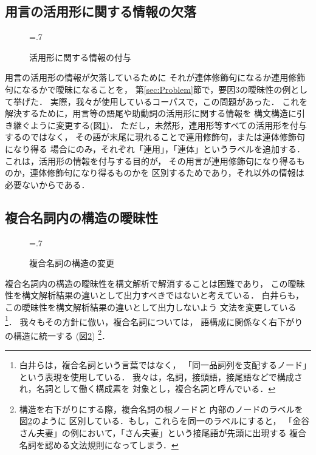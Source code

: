 \subsection{用言の活用形に関する情報の欠落}

\begin{figure}[tp]
  \centering
  \epsfxsize=.7\textwidth
  \caption{活用形に関する情報の付与}
  \label{fig:conjugation}
\end{figure}

用言の活用形の情報が欠落しているために
それが連体修飾句になるか連用修飾句になるかで曖昧になることを，
第\ref{sec:Problem}節で，要因3の曖昧性の例として挙げた．
実際，我々が使用しているコーパスで，この問題があった．
これを解決するために，用言等の語尾や助動詞の活用形に関する情報を
構文構造に引き継ぐように変更する(図\ref{fig:conjugation})．
ただし，未然形，連用形等すべての活用形を付与するのではなく，
その語が末尾に現れることで連用修飾句，または連体修飾句になり得る
場合にのみ，それぞれ「連用」，「連体」というラベルを追加する．
これは，活用形の情報を付与する目的が，
その用言が連用修飾句になり得るものか，連体修飾句になり得るものかを
区別するためであり，それ以外の情報は必要ないからである．

\subsection{複合名詞内の構造の曖昧性}

\begin{figure}[tp]
  \centering
  \epsfxsize=.7\textwidth
  \caption{複合名詞の構造の変更}
  \label{fig:convert_compound_noun}
\end{figure}

複合名詞内の構造の曖昧性を構文解析で解消することは困難であり，
この曖昧性を構文解析結果の違いとして出力すべきではないと考えている．
白井らも，この曖昧性を構文解析結果の違いとして出力しないよう
文法を変更している\cite{shirai:97}
\footnote{白井らは，複合名詞という言葉ではなく，
「同一品詞列を支配するノード」という表現を使用している．
我々は，名詞，接頭語，接尾語などで構成され，名詞として働く構成素を
対象とし，複合名詞と呼んでいる．}．
我々もその方針に倣い，複合名詞については，
語構成に関係なく右下がりの構造に統一する
(図\ref{fig:convert_compound_noun})
\footnote{構造を右下がりにする際，複合名詞の根ノードと
内部のノードのラベルを図\ref{fig:convert_compound_noun}のように
区別している．もし，これらを同一のラベルにすると，
「金谷さん夫妻」の例において，「さん夫妻」という接尾語が先頭に出現する
複合名詞を認める文法規則になってしまう．}．



